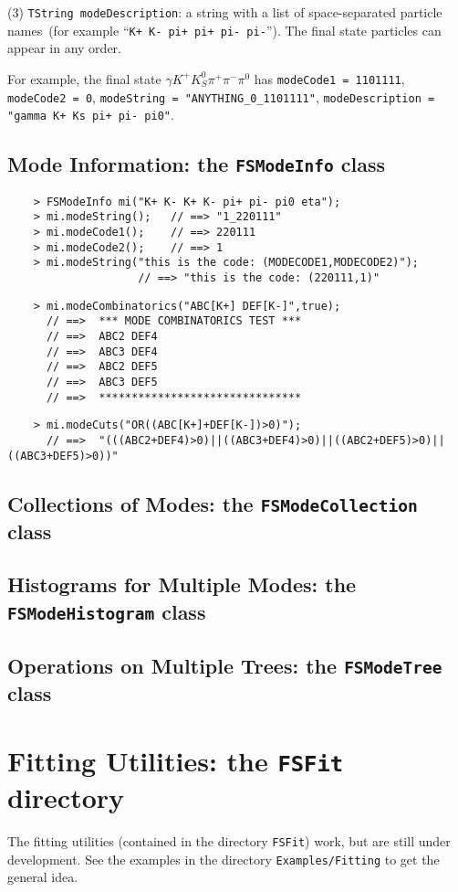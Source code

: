 \documentclass[11pt]{article}
\begin{document}
(3) {\tt TString modeDescription}: a string with a list of space-separated particle names~(for example ``{\tt K+ K- pi+ pi+ pi- pi-}'').  The final state particles can appear in any order. 

For example, the final state $\gamma K^+ K^0_S \pi^+ \pi^- \pi^0$ has {\tt modeCode1 = 1101111}, {\tt modeCode2 = 0}, {\tt modeString = "ANYTHING\_0\_1101111"}, {\tt modeDescription = "gamma K+ Ks pi+ pi- pi0"}. 

\subsection{Mode Information: the {\tt FSModeInfo} class}

\begin{verbatim}
    > FSModeInfo mi("K+ K- K+ K- pi+ pi- pi0 eta");
    > mi.modeString();   // ==> "1_220111"
    > mi.modeCode1();    // ==> 220111
    > mi.modeCode2();    // ==> 1
    > mi.modeString("this is the code: (MODECODE1,MODECODE2)");
                    // ==> "this is the code: (220111,1)" 
\end{verbatim}


\begin{verbatim}
    > mi.modeCombinatorics("ABC[K+] DEF[K-]",true);
      // ==>  *** MODE COMBINATORICS TEST ***
      // ==>  ABC2 DEF4
      // ==>  ABC3 DEF4
      // ==>  ABC2 DEF5
      // ==>  ABC3 DEF5
      // ==>  *******************************
\end{verbatim}

\begin{verbatim}
    > mi.modeCuts("OR((ABC[K+]+DEF[K-])>0)");
      // ==>  "(((ABC2+DEF4)>0)||((ABC3+DEF4)>0)||((ABC2+DEF5)>0)||((ABC3+DEF5)>0))"
\end{verbatim}


\subsection{Collections of Modes: the {\tt FSModeCollection} class}

\subsection{Histograms for Multiple Modes: the {\tt FSModeHistogram} class}

\subsection{Operations on Multiple Trees: the {\tt FSModeTree} class}

\section{Fitting Utilities:  the {\tt FSFit} directory}

The fitting utilities (contained in the directory {\tt FSFit}) work, but are still under development.  See the examples in the directory {\tt Examples/Fitting} to get the general idea.
\end{document}
